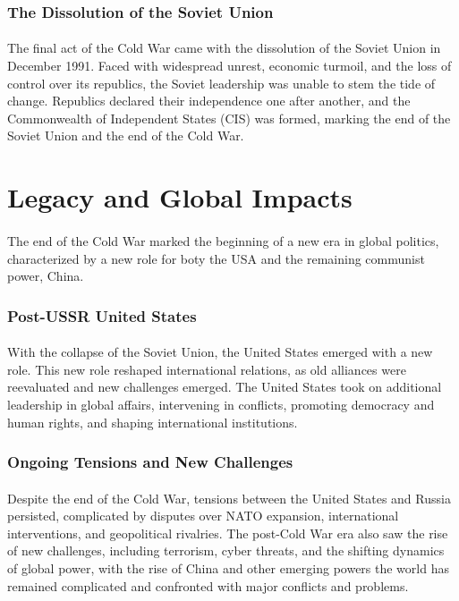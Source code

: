 \documentclass[a4paper,12pt]{book}
\begin{document}
\subsubsection*{The Dissolution of the Soviet Union}
\paragraph{}
The final act of the Cold War came with the dissolution of the Soviet Union in December 1991. Faced with widespread unrest, economic turmoil, and the loss of control over its republics, the Soviet leadership was unable to stem the tide of change. Republics declared their independence one after another, and the Commonwealth of Independent States (CIS) was formed, marking the end of the Soviet Union and the end of the Cold War. 

\section*{Legacy and Global Impacts}
\paragraph{}
The end of the Cold War marked the beginning of a new era in global politics, characterized by a new role for boty the USA and the remaining communist power, China. 

\subsubsection*{Post-USSR United States}
\paragraph{}
With the collapse of the Soviet Union, the United States emerged with a new role. This new role reshaped international relations, as old alliances were reevaluated and new challenges emerged. The United States took on additional leadership in global affairs, intervening in conflicts, promoting democracy and human rights, and shaping international institutions. 

\subsubsection*{Ongoing Tensions and New Challenges}
\paragraph{}
Despite the end of the Cold War, tensions between the United States and Russia persisted, complicated by disputes over NATO expansion, international interventions, and geopolitical rivalries. The post-Cold War era also saw the rise of new challenges, including terrorism, cyber threats, and the shifting dynamics of global power, with the rise of China and other emerging powers the world has remained complicated and confronted with major conflicts and problems.
\end{document}

